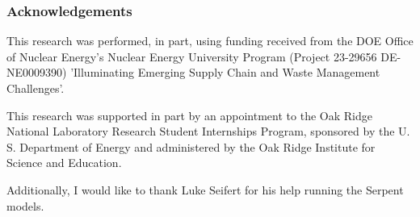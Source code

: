 \begin{frame}
  \frametitle{Acknowledgements}
  This research was performed, in part, using funding received from the DOE
  Office of Nuclear Energy's Nuclear Energy University Program (Project 23-29656
  DE-NE0009390) 'Illuminating Emerging Supply Chain and Waste Management
  Challenges'.

  \vspace{0.5cm}

  This research was supported in part by an appointment to the Oak Ridge
  National Laboratory Research Student Internships Program, sponsored by the U.
  S. Department of Energy and administered by the Oak Ridge Institute for
  Science and Education.

  \vspace{0.5cm}

  Additionally, I would like to thank Luke Seifert for his help running the Serpent models.
\end{frame}
